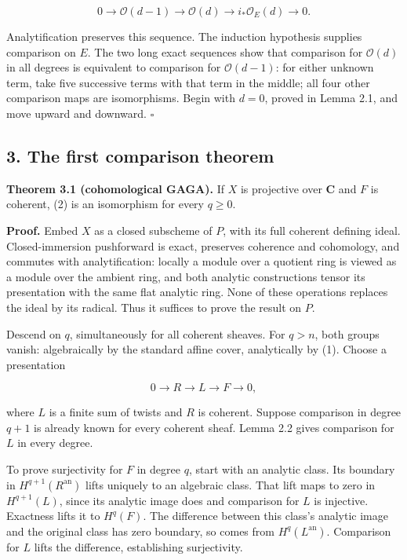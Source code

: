 \documentclass[11pt]{article}
\begin{document}
\[
0\to\mathcal O(d-1)\to\mathcal O(d)
\to i_*\mathcal O_E(d)\to0.
\tag{3}
\]

Analytification preserves this sequence. The induction hypothesis
supplies comparison on \(E\). The two long exact sequences show that
comparison for \(\mathcal O(d)\) in all degrees is equivalent to
comparison for \(\mathcal O(d-1)\): for either unknown term, take five
successive terms with that term in the middle; all four other comparison
maps are isomorphisms. Begin with \(d=0\), proved in Lemma 2.1, and move
upward and downward. \(\square\)

\subsection{3. The first comparison
theorem}\label{the-first-comparison-theorem}

\textbf{Theorem 3.1 (cohomological GAGA).} If \(X\) is projective over
\(\mathbf C\) and \(F\) is coherent, (2) is an isomorphism for every
\(q\geq0\).

\textbf{Proof.} Embed \(X\) as a closed subscheme of \(P\), with its
full coherent defining ideal. Closed-immersion pushforward is exact,
preserves coherence and cohomology, and commutes with analytification:
locally a module over a quotient ring is viewed as a module over the
ambient ring, and both analytic constructions tensor its presentation
with the same flat analytic ring. None of these operations replaces the
ideal by its radical. Thus it suffices to prove the result on \(P\).

Descend on \(q\), simultaneously for all coherent sheaves. For \(q>n\),
both groups vanish: algebraically by the standard affine cover,
analytically by (1). Choose a presentation

\[
0\to R\to L\to F\to0,
\tag{4}
\]

where \(L\) is a finite sum of twists and \(R\) is coherent. Suppose
comparison in degree \(q+1\) is already known for every coherent sheaf.
Lemma 2.2 gives comparison for \(L\) in every degree.

To prove surjectivity for \(F\) in degree \(q\), start with an analytic
class. Its boundary in \(H^{q+1}(R^{\mathrm{an}})\) lifts uniquely to an
algebraic class. That lift maps to zero in \(H^{q+1}(L)\), since its
analytic image does and comparison for \(L\) is injective. Exactness
lifts it to \(H^q(F)\). The difference between this class's analytic
image and the original class has zero boundary, so comes from
\(H^q(L^{\mathrm{an}})\). Comparison for \(L\) lifts the difference,
establishing surjectivity.
\end{document}
